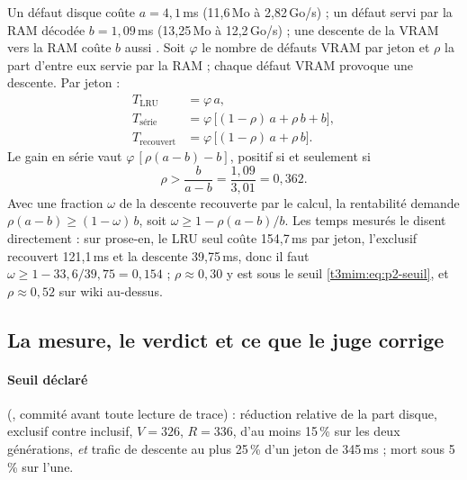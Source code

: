 Un défaut disque coûte $a = 4{,}1$\,ms (11,6\,Mo à 2,82\,Go/s) ; un défaut servi par la RAM décodée $b = 1{,}09$\,ms (13,25\,Mo à 12,2\,Go/s) ; une descente de la VRAM vers la RAM coûte $b$ aussi \calc. Soit $\varphi$ le nombre de défauts VRAM par jeton et $\rho$ la part d'entre eux servie par la RAM ; chaque défaut VRAM provoque une descente. Par jeton :
\begin{align}
T_{\text{LRU}} &= \varphi\,a, \nonumber\\
T_{\text{série}} &= \varphi\,\bigl[(1-\rho)\,a + \rho\,b + b\bigr], \nonumber\\
T_{\text{recouvert}} &= \varphi\,\bigl[(1-\rho)\,a + \rho\,b\bigr]. \label{t3mim:eq:p2-cout}
\end{align}
Le gain en série vaut $\varphi\,[\rho(a-b) - b]$, positif si et seulement si
\begin{equation}\label{t3mim:eq:p2-seuil}
\rho > \frac{b}{a-b} = \frac{1{,}09}{3{,}01} = 0{,}362 .
\end{equation}
Avec une fraction $\omega$ de la descente recouverte par le calcul, la rentabilité demande $\rho(a-b) \ge (1-\omega)\,b$, soit $\omega \ge 1 - \rho(a-b)/b$. Les temps mesurés le disent directement : sur prose-en, le LRU seul coûte 154,7\,ms par jeton, l'exclusif recouvert 121,1\,ms et la descente 39,75\,ms, donc il faut $\omega \ge 1 - 33{,}6/39{,}75 = 0{,}154$ \calc ; $\rho \approx 0{,}30$ y est sous le seuil \eqref{t3mim:eq:p2-seuil}, et $\rho \approx 0{,}52$ sur wiki au-dessus.

\subsection{La mesure, le verdict et ce que le juge corrige}\label{t3mim:sec:p2-verdict}

\paragraph{Seuil déclaré} (, commité avant toute lecture de trace) : réduction relative de la part disque, exclusif contre inclusif, $V = 326$, $R = 336$, d'au moins 15\,\% sur les deux générations, \emph{et} trafic de descente au plus 25\,\% d'un jeton de 345\,ms ; mort sous 5\,\% sur l'une.

